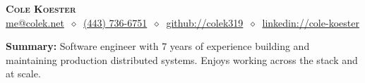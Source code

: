 \documentclass[letterpaper,11pt]{article}
\begin{document}
\begin{center}
\textbf{\LARGE\scshape Cole Koester} \\
\vspace{1pt}\small
\href{mailto:me@colek.net}{me@colek.net}
$\ \diamond\ $
\href{tel:+14437366751}{(443) 736-6751}
$\ \diamond\ $
\href{https://github.com/colek319}{github://colek319}
$\ \diamond\ $
\href{https://www.linkedin.com/in/cole-koester}{linkedin://cole-koester}
\end{center}

\noindent\begin{minipage}{\textwidth}
\footnotesize
\textbf{Summary:} Software engineer with 7 years of experience building and maintaining production distributed systems. Enjoys working across the stack and at scale.
\end{minipage}
\end{document}
